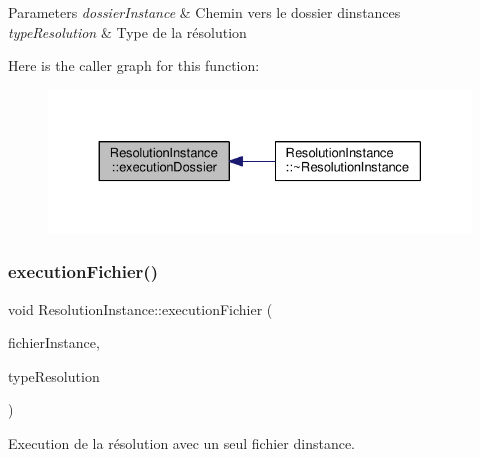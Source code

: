 \begin{DoxyParams}{Parameters}
{\em dossier\+Instance} & Chemin vers le dossier d\textquotesingle{}instances \\
\hline
{\em type\+Resolution} & Type de la résolution \\
\hline
\end{DoxyParams}
Here is the caller graph for this function\+:\nopagebreak
\begin{figure}[H]
\begin{center}
\leavevmode
\includegraphics[width=330pt]{classResolutionInstance_aa4184555e523d745accf570986f6fe45_icgraph}
\end{center}
\end{figure}
\mbox{\label{classResolutionInstance_a69b08f7877d8f12481f02bc31d1d391b}} 
\subsubsection{\texorpdfstring{execution\+Fichier()}{executionFichier()}}
{\footnotesize\ttfamily void Resolution\+Instance\+::execution\+Fichier (\begin{DoxyParamCaption}\item[{Q\+String}]{fichier\+Instance,  }\item[{Q\+String}]{type\+Resolution }\end{DoxyParamCaption})}



Execution de la résolution avec un seul fichier d\textquotesingle{}instance. 


